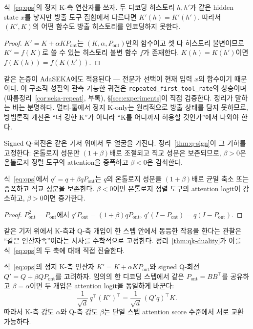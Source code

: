 \begin{theorem}\label{thm:no-memory}
식~\eqref{eq:ops}의 정지 K-측 연산자를 쓰자. 두 디코딩 히스토리 $h, h'$가 같은 hidden state $x$를 낳지만 방출 도구 집합에서 다르다면 $K'(h) = K'(h')$. 따라서 $(K', K)$의 어떤 함수도 방출 히스토리를 인코딩하지 못한다.
\end{theorem}

\begin{proof}
$K' = K + \alpha K P_{\mathrm{ont}}$는 $(K, \alpha, P_{\mathrm{ont}})$만의 함수이고 셋 다 히스토리 불변이므로 $K' = f(K)$로 쓸 수 있는 히스토리 불변 함수 $f$가 존재한다. $K(h) = K(h')$이면 $f(K(h)) = f(K(h'))$.
\end{proof}

같은 논증이 AdaSEKA에도 적용된다 — 전문가 선택이 현재 입력 $x$의 함수이기 때문이다. 이 구조적 성질의 관측 가능한 귀결은 \texttt{repeated\_first\_tool\_rate}의 상승이며(따름정리~\ref{cor:seka-repeat}, 부록), \S\ref{sec:experiments}이 직접 검증한다. 정리가 말하는 바는 분명하다. 멀티-툴에서 정지 K-only는 원리적으로 방출 상태를 담지 못하므로, 방법론적 개선은 ``더 강한 K''가 아니라 ``K를 어디까지 허용할 것인가''에서 나와야 한다.

Signed Q-회전은 같은 기저 위에서 두 얼굴을 가진다. 정리~\ref{thm:q-sign}이 그 기하를 고정한다: 온톨로지 성분만 $(1+\beta)$배로 조절되고 직교 성분은 보존되므로, $\beta>0$은 온톨로지 정렬 도구의 attention을 증폭하고 $\beta<0$은 감쇠한다.

\begin{theorem}[Q-사영의 기하]\label{thm:q-sign}
식~\eqref{eq:ops}에서 $q' = q + \beta q P_{\mathrm{ont}}$는 $q$의 온톨로지 성분을 $(1+\beta)$배로 균일 축소 또는 증폭하고 직교 성분을 보존한다. $\beta<0$이면 온톨로지 정렬 도구의 attention logit이 감소하고, $\beta>0$이면 증가한다.
\end{theorem}

\begin{proof}
$P_{\mathrm{ont}}^2 = P_{\mathrm{ont}}$에서 $q' P_{\mathrm{ont}} = (1+\beta) q P_{\mathrm{ont}}$, $q'(I-P_{\mathrm{ont}}) = q(I-P_{\mathrm{ont}})$.
\end{proof}

같은 기저 위에서 K-측과 Q-측 개입이 한 스텝 안에서 동등한 작용을 한다는 관찰은 ``같은 연산자족''이라는 서사를 수학적으로 고정한다. 정리~\ref{thm:qk-duality}가 이를 식~\eqref{eq:ops}의 두 축에 대해 직접 진술한다.

\begin{theorem}\label{thm:qk-duality}
식~\eqref{eq:ops}의 정지 K-측 연산자 $K' = K + \alpha K P_{\mathrm{ont}}$와 signed Q-회전 $Q' = Q + \beta Q P_{\mathrm{ont}}$를 고려하자. 임의의 한 디코딩 스텝에서 같은 $P_{\mathrm{ont}} = BB^\top$를 공유하고 $\beta = \alpha$이면 두 개입은 attention logit을 동일하게 바꾼다:
\begin{equation}\label{eq:duality}
\frac{1}{\sqrt d}\, q^\top (K')^\top = \frac{1}{\sqrt d}\, (Q' q)^\top K.
\end{equation}
따라서 K-측 강도 $\alpha$와 Q-측 강도 $\beta$는 단일 스텝 attention score 수준에서 서로 교환 가능하다.
\end{theorem}

